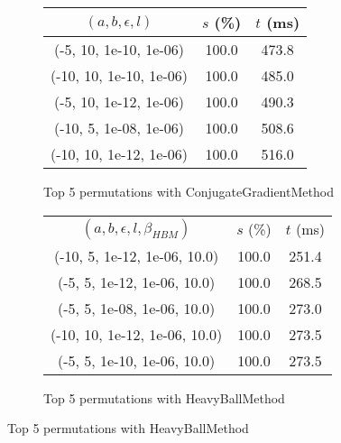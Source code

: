 \begin{figure}[H]
\begin{subfigure}[ht]{.5\textwidth}
\begin{tabular}{|c|c|c|}
\hline
\rowcolor{gray!25}
$(a,b,\epsilon,l)$ & $s$ (\%) & $t$ (ms) \\
\hline
(-5, 10, 1e-10, 1e-06) & 100.0 & 473.8 \\
(-10, 10, 1e-10, 1e-06) & 100.0 & 485.0 \\
(-5, 10, 1e-12, 1e-06) & 100.0 & 490.3 \\
(-10, 5, 1e-08, 1e-06) & 100.0 & 508.6 \\
(-10, 10, 1e-12, 1e-06) & 100.0 & 516.0 \\
\hline
\end{tabular}
\caption{Top 5 permutations with ConjugateGradientMethod}
\label{subfig:param_comp_MatrixSquareSum_ConjugateGradientMethod_FibonacciSearch}
\end{subfigure}
\hfill
\begin{subfigure}[ht]{.5\textwidth}
\begin{tabular}{|c|c|c|}
\hline
\rowcolor{gray!25}
\multicolumn{3}{|c|}{HeavyBallMethod} \\
\hline
\rowcolor{gray!25}
$(a,b,\epsilon,l,\beta_{HBM})$ & $s$ (\%) & $t$ (ms) \\
\hline
(-10, 5, 1e-12, 1e-06, 10.0) & 100.0 & 251.4 \\
(-5, 5, 1e-12, 1e-06, 10.0) & 100.0 & 268.5 \\
(-5, 5, 1e-08, 1e-06, 10.0) & 100.0 & 273.0 \\
(-10, 10, 1e-12, 1e-06, 10.0) & 100.0 & 273.5 \\
(-5, 5, 1e-10, 1e-06, 10.0) & 100.0 & 273.5 \\
\hline
\end{tabular}
\caption{Top 5 permutations with HeavyBallMethod}
\label{subfig:param_comp_MatrixSquareSum_HeavyBallMethod_FibonacciSearch}
\end{subfigure}
\end{figure}

